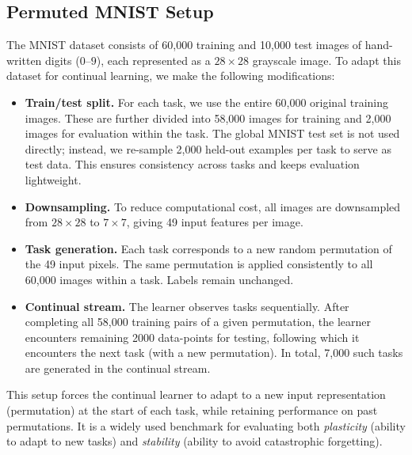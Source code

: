\documentclass{article}
\begin{document}
\subsection{Permuted MNIST Setup}
\label{sec:permuted_mnist_setup}
The MNIST dataset \citep{lecun1998gradient} consists of 60,000 training and 10,000 test images of hand-written digits ($0$–$9$), each represented as a $28 \times 28$ grayscale image.  
To adapt this dataset for continual learning, we make the following modifications:

\begin{itemize}
    \item \textbf{Train/test split.} For each task, we use the entire 60,000 original training images. These are further divided into 58,000 images for training and 2,000 images for evaluation within the task. The global MNIST test set is not used directly; instead, we re-sample 2,000 held-out examples per task to serve as test data. This ensures consistency across tasks and keeps evaluation lightweight.
    
    \item \textbf{Downsampling.} To reduce computational cost, all images are downsampled from $28 \times 28$ to $7 \times 7$, giving 49 input features per image.
    
    \item \textbf{Task generation.} Each task corresponds to a new random permutation of the 49 input pixels. The same permutation is applied consistently to all 60,000 images within a task. Labels remain unchanged.
    
    \item \textbf{Continual stream.} The learner observes tasks sequentially. After completing all 58,000 training pairs of a given permutation, the learner encounters remaining 2000 data-points for testing, following which it encounters the next task (with a new permutation). In total, 7,000 such tasks are generated in the continual stream.
\end{itemize}

This setup forces the continual learner to adapt to a new input representation (permutation) at the start of each task, while retaining performance on past permutations. It is a widely used benchmark for evaluating both \textit{plasticity} (ability to adapt to new tasks) and \textit{stability} (ability to avoid catastrophic forgetting).
\end{document}
